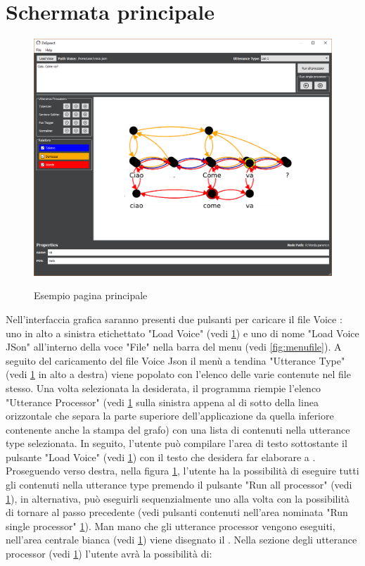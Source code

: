 \documentclass[../AnalisideiRequisiti.tex]{subfiles}
\begin{document}
	\section{Schermata principale}
		\begin{figure}[htp]
			\caption{Esempio pagina principale}
			\centering
			\includegraphics[width=\textwidth]{../img/paginainiziale.png}
			\label{fig:GUI}
		\end{figure}	
		Nell'interfaccia grafica saranno presenti due pulsanti per caricare il file Voice : uno in alto a sinistra etichettato "Load Voice" (vedi \ref{fig:GUI}) e uno di nome "Load Voice JSon" all'interno della voce "File" nella barra del menu (vedi \ref{fig:menufile}).
		 A seguito del caricamento del file Voice Json il menù a tendina "Utterance Type" (vedi \ref{fig:GUI} in alto a destra) viene popolato con l'elenco delle varie  contenute nel file stesso. 
		 Una volta selezionata la  desiderata, il programma riempie l'elenco "Utterance Processor" (vedi \ref{fig:GUI} sulla sinistra appena al di sotto della linea orizzontale che separa la parte superiore dell'applicazione da quella inferiore contenente anche la stampa del grafo) con una lista di  contenuti nella utterance type selezionata. 
		 In seguito, l'utente può compilare l'area di testo sottostante il pulsante "Load Voice" (vedi \ref{fig:GUI}) con il testo che desidera far elaborare a .
		 Proseguendo verso destra, nella figura \ref{fig:GUI}, l'utente ha la possibilità di eseguire tutti gli  contenuti nella utterance type premendo il pulsante "Run all processor" (vedi \ref{fig:GUI}), in alternativa, può eseguirli sequenzialmente uno alla volta con la possibilità di tornare al passo precedente (vedi pulsanti contenuti nell'area nominata "Run single processor" \ref{fig:GUI}).  Man mano che gli utterance processor vengono eseguiti, nell'area centrale bianca (vedi \ref{fig:GUI}) viene disegnato il . Nella sezione degli utterance processor (vedi \ref{fig:GUI}) l'utente avrà la possibilità di:
\end{document}
